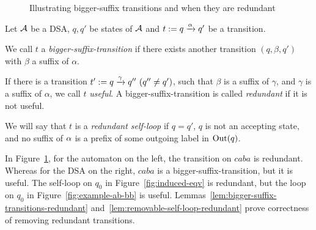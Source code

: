 \begin{figure}[t]
  \centering
  \caption{Illustrating bigger-suffix transitions and when they are
    redundant}
  \label{fig:bigger-suffix-transitions}
\end{figure}

\begin{definition}\label{def:redundant-transitions}
  Let $\mathcal{A}$ be a DSA, $q, q'$ be states of $\mathcal{A}$ and
  $t:= q \xrightarrow{\alpha} q'$ be a transition.

  We call $t$ a \emph{bigger-suffix-transition} if there exists
  another transition $(q, \beta, q')$ with $\beta$ a suffix of $\alpha$. 

  If there is a transition $t' := q \xrightarrow{\gamma} q'' ~ (q'' \neq q')$,
  such that $\beta$ is a suffix of $\gamma$, and $\gamma$ is a suffix
  of $\alpha$, we call $t$ \emph{useful}. A
  bigger-suffix-transition is called \emph{redundant} if it is not
  useful.

  We will say that $t$ is a \emph{redundant self-loop} if $q = q'$,
  $q$ is not an accepting state, and no suffix of $\alpha$ is a prefix of
  some outgoing label in $\operatorname{Out}(q)$.
\end{definition}

In Figure~\ref{fig:bigger-suffix-transitions}, for the automaton on
the left, the transition on $caba$ is redundant. Whereas for the DSA on
the right, $caba$ is a bigger-suffix-transition, but it is
useful. The
self-loop on $q_0$ in Figure~\ref{fig:induced-eqv} is
redundant, but the loop on $q_0$ in Figure~\ref{fig:example-ab-bb}
is useful. Lemmas~\ref{lem:bigger-suffix-transitions-redundant}
and~\ref{lem:removable-self-loop-redundant} 
prove correctness of
removing redundant transitions.

